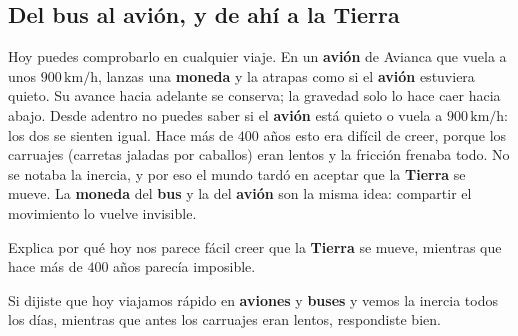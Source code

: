\documentclass[
  spanish,
  letterpaper,
  12pt,
  oneside,
  open=any,
  DIV=15]{scrbook}
\begin{document}
\subsection{Del bus al avión, y de ahí a la
Tierra}\label{del-bus-al-aviuxf3n-y-de-ahuxed-a-la-tierra}

Hoy puedes comprobarlo en cualquier viaje. En un
\textcolor[HTML]{7C3AED}{\textbf{avión}} de Avianca que vuela a unos
\(900\,\text{km/h}\), lanzas una
\textcolor[HTML]{2563EB}{\textbf{moneda}} y la atrapas como si el
\textbf{avión} estuviera quieto. Su avance hacia adelante se conserva;
la gravedad solo lo hace caer hacia abajo. Desde adentro no puedes saber
si el \textbf{avión} está quieto o vuela a \(900\,\text{km/h}\): los dos
se sienten igual. Hace más de \(400\) años esto era difícil de creer,
porque los carruajes (carretas jaladas por caballos) eran lentos y la
fricción frenaba todo. No se notaba la inercia, y por eso el mundo tardó
en aceptar que la \textcolor[HTML]{7C3AED}{\textbf{Tierra}} se mueve. La
\textbf{moneda} del \textcolor[HTML]{7C3AED}{\textbf{bus}} y la del
\textbf{avión} son la misma idea: compartir el movimiento lo vuelve
invisible.

\begin{tcolorbox}[enhanced jigsaw, arc=.35mm, bottomrule=.15mm, bottomtitle=1mm, breakable, colback=white, colbacktitle=quarto-callout-warning-color!10!white, colframe=quarto-callout-warning-color-frame, coltitle=black, left=2mm, leftrule=.75mm, opacityback=0, opacitybacktitle=0.6, rightrule=.15mm, title=\textcolor{quarto-callout-warning-color}{\faExclamationTriangle}\hspace{0.5em}{Pregunta de comprensión}, titlerule=0mm, toprule=.15mm, toptitle=1mm]

Explica por qué hoy nos parece fácil creer que la \textbf{Tierra} se
mueve, mientras que hace más de \(400\) años parecía imposible.

\end{tcolorbox}

\begin{tcolorbox}[enhanced jigsaw, arc=.35mm, bottomrule=.15mm, bottomtitle=1mm, breakable, colback=white, colbacktitle=quarto-callout-tip-color!10!white, colframe=quarto-callout-tip-color-frame, coltitle=black, left=2mm, leftrule=.75mm, opacityback=0, opacitybacktitle=0.6, rightrule=.15mm, title=\textcolor{quarto-callout-tip-color}{\faLightbulb}\hspace{0.5em}{Apoyo Procedimental (Comprobación)}, titlerule=0mm, toprule=.15mm, toptitle=1mm]

Si dijiste que hoy viajamos rápido en \textbf{aviones} y \textbf{buses}
y vemos la inercia todos los días, mientras que antes los carruajes eran
lentos, respondiste bien.

\end{tcolorbox}
\end{document}
